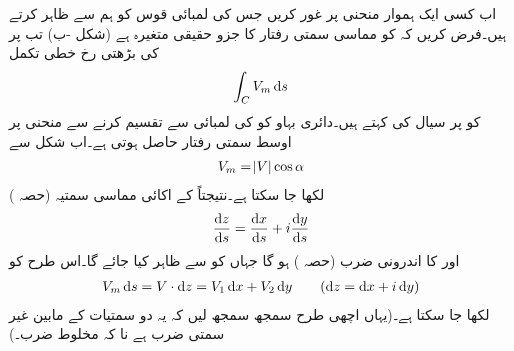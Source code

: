 اب کسی ایک ہموار منحنی  پر غور کریں جس کی  لمبائی قوس کو ہم  سے ظاہر کرتے ہیں۔فرض کریں کہ  کو مماسی  سمتی رفتار  کا  جزو حقیقی متغیرہ   ہے (شکل -ب) تب  پر  کی بڑھتی رخ خطی تکمل
\begin{align}
\int_C V_m\dif s
\end{align}
کو  پر سیال کی  کہتے ہیں۔دائری بہاو کو  کی لمبائی سے تقسیم کرنے سے منحنی  پر اوسط سمتی رفتار 
 حاصل ہوتی ہے۔اب شکل  سے
\begin{align*}
V_m=\abs{V}\cos \alpha
\end{align*}
لکھا جا سکتا ہے۔نتیجتاً   کے اکائی مماسی سمتیہ (حصہ )
\begin{align*}
\frac{\dif z}{\dif s}=\frac{\dif x}{\dif s}+i\frac{\dif y}{\dif s}
\end{align*}
اور  کا اندرونی ضرب (حصہ )  ہو گا جہاں  کو  سے ظاہر کیا جائے گا۔اس طرح  کو 
\begin{align*}
V_m\dif s=V\cdot \dif z=V_1\dif x+V_2\dif y\quad \quad (\dif z=\dif x+i\dif y)
\end{align*}
لکھا جا سکتا ہے۔(یہاں اچھی طرح سمجھ سمجھ لیں کہ یہ دو سمتیات کے مابین غیر سمتی ضرب ہے نا کہ مخلوط ضرب۔)


